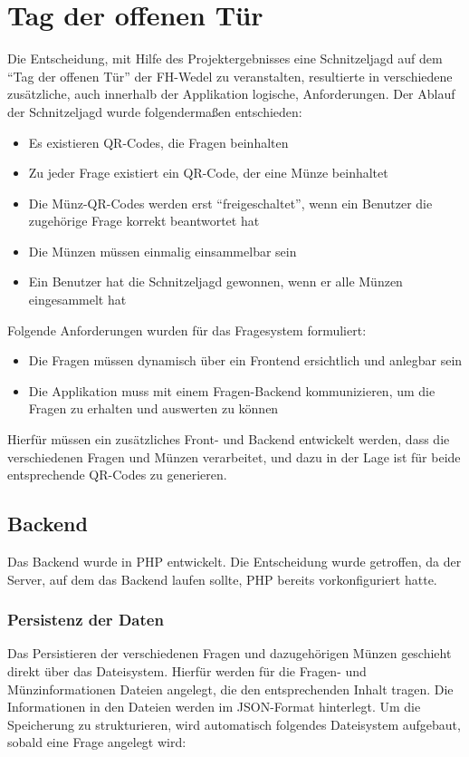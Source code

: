 \chapter{Tag der offenen Tür}

Die Entscheidung, mit Hilfe des Projektergebnisses eine Schnitzeljagd auf dem “Tag der offenen Tür” der FH-Wedel zu veranstalten, resultierte in verschiedene zusätzliche, auch innerhalb der Applikation logische, Anforderungen.
Der Ablauf der Schnitzeljagd wurde folgendermaßen entschieden:

\begin{itemize}
\item Es existieren QR-Codes, die Fragen beinhalten
\item Zu jeder Frage existiert ein QR-Code, der eine Münze beinhaltet
\item Die Münz-QR-Codes werden erst “freigeschaltet”, wenn ein Benutzer die zugehörige Frage korrekt beantwortet hat
\item Die Münzen müssen einmalig einsammelbar sein
\item Ein Benutzer hat die Schnitzeljagd gewonnen, wenn er alle Münzen eingesammelt hat
\end{itemize}
Folgende Anforderungen wurden für das Fragesystem formuliert:

\begin{itemize}
\item Die Fragen müssen dynamisch über ein Frontend ersichtlich und anlegbar sein
\item Die Applikation muss mit einem Fragen-Backend kommunizieren, um die Fragen zu erhalten und auswerten zu können
\end{itemize}

Hierfür müssen ein zusätzliches Front- und Backend entwickelt werden, dass die verschiedenen Fragen und Münzen verarbeitet, und dazu in der Lage ist für beide entsprechende QR-Codes zu generieren.

\section{Backend}
Das Backend wurde in PHP entwickelt. Die Entscheidung wurde getroffen, da der Server, auf dem das Backend laufen sollte, PHP bereits vorkonfiguriert hatte.

\subsection{Persistenz der Daten}
\label{sub:Persistenz}
Das Persistieren der verschiedenen Fragen und dazugehörigen Münzen geschieht direkt über das Dateisystem. Hierfür werden für die Fragen- und Münzinformationen Dateien angelegt, die den entsprechenden Inhalt tragen. Die Informationen in den Dateien werden im JSON-Format hinterlegt.
Um die Speicherung zu strukturieren, wird automatisch folgendes Dateisystem aufgebaut, sobald eine Frage angelegt wird:

